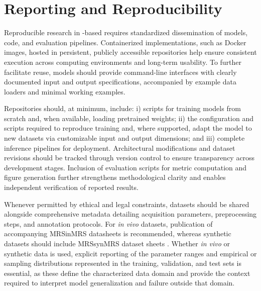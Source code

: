 \section{Reporting and Reproducibility}
\label{sec:comm reporting}
Reproducible research in \DL-based \MRS requires standardized dissemination of models, code, and evaluation pipelines. Containerized implementations, such as Docker images, hosted in persistent, publicly accessible repositories help ensure consistent execution across computing environments and long-term usability. To further facilitate reuse, models should provide command-line interfaces with clearly documented input and output specifications, accompanied by example data loaders and minimal working examples.

Repositories should, at minimum, include: i) scripts for training models from scratch and, when available, loading pretrained weights; ii) the configuration and scripts required to reproduce training and, where supported, adapt the model to new datasets via customizable input and output dimensions; and iii) complete inference pipelines for deployment. Architectural modifications and dataset revisions should be tracked through version control to ensure transparency across development stages. Inclusion of evaluation scripts for metric computation and figure generation further strengthens methodological clarity and enables independent verification of reported results.

Whenever permitted by ethical and legal constraints, datasets should be shared alongside comprehensive metadata detailing acquisition parameters, preprocessing steps, and annotation protocols. For \textit{in vivo} datasets, publication of accompanying MRSinMRS datasheets \cite{Lin2021} is recommended, whereas synthetic datasets should include MRSsynMRS dataset sheets \cite{LaMaster2026}. Whether \textit{in vivo} or synthetic data is used, explicit reporting of the parameter ranges and empirical or sampling distributions represented in the training, validation, and test sets is essential, as these define the characterized data domain and provide the context required to interpret model generalization and failure outside that domain.

